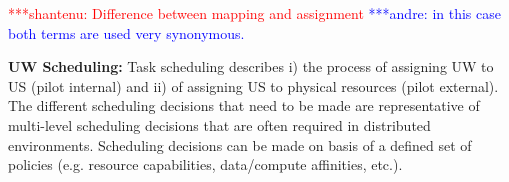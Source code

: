 \documentclass[conference,final]{IEEEtran}
\newcommand{\jhanote}[1]{ {\textcolor{red} { ***shantenu: #1 }}}
\newcommand{\alnote}[1]{ {\textcolor{blue} { ***andre: #1 }}}
\newcommand{\alnote}[1]{}
\newcommand{\jhanote}[1]{}
\begin{document}
\jhanote{Difference between mapping and assignment}\alnote{in this case both terms are used very synonymous.}

\textbf{UW Scheduling:} Task scheduling describes i) the process of
assigning UW to US (pilot internal) and ii) of assigning US to physical
resources (pilot external).  The different scheduling decisions that
need to be made are representative of multi-level scheduling decisions
that are often required in distributed environments.  Scheduling
decisions can be made on basis of a defined set of policies
(e.g. resource capabilities, data/compute affinities, etc.).


	
	
\end{document}
